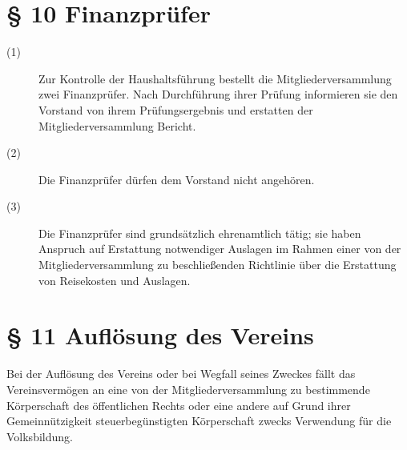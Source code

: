 \documentclass[12pt,paper=a4,ngerman]{scrreprt}
\begin{document}
\section{\S{} 10 Finanzprüfer}
\begin{description}
	\item[(1)] Zur Kontrolle der Haushaltsführung bestellt die Mitgliederversammlung zwei Finanzprüfer. Nach Durchführung ihrer Prüfung informieren sie den Vorstand von ihrem Prüfungsergebnis und erstatten der Mitgliederversammlung Bericht.
	\item[(2)] Die Finanzprüfer dürfen dem Vorstand nicht angehören.
	\item[(3)] Die Finanzprüfer sind grundsätzlich ehrenamtlich tätig; sie haben Anspruch auf Erstattung notwendiger Auslagen im Rahmen einer von der Mitgliederversammlung zu beschließenden Richtlinie über die Erstattung von Reisekosten und Auslagen.
\end{description}
\section{\S{} 11 Auflösung des Vereins}
Bei der Auflösung des Vereins oder bei Wegfall seines Zweckes fällt das Vereinsvermögen an eine von der Mitgliederversammlung zu bestimmende Körperschaft des öffentlichen Rechts oder eine andere auf Grund ihrer Gemeinnützigkeit steuerbegünstigten Körperschaft zwecks Verwendung für die Volksbildung.
\end{document}
